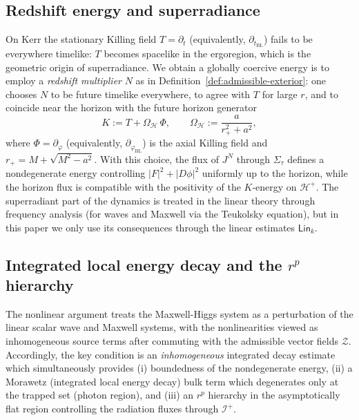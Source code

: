 \documentclass[11pt]{article}
\numberwithin{equation}{section}
\theoremstyle{plain}
\theoremstyle{definition}
\theoremstyle{remark}
\newcommand{\Lin}{\mathsf{Lin}}
\begin{document}
\subsection{Redshift energy and superradiance}\label{subsec:kerr-redshift}

On Kerr the stationary Killing field $T=\partial_{t}$ (equivalently, $\partial_{t_{\mathrm{BL}}}$) fails to be everywhere timelike: $T$ becomes spacelike in the ergoregion, which is the geometric origin of superradiance.
We obtain a globally coercive energy is to employ a \emph{redshift multiplier} $N$ as in Definition~\ref{def:admissible-exterior}: one chooses $N$ to be future timelike everywhere, to agree with $T$ for large $r$, and to coincide near the horizon with the future horizon generator
\begin{equation}\label{eq:kerr-horizon-generator}
K:=T+\Omega_{\mathcal H}\,\Phi,
\qquad
\Omega_{\mathcal H}:=\frac{a}{r_{+}^{2}+a^{2}},
\end{equation}
where $\Phi=\partial_{\varphi}$ (equivalently, $\partial_{\varphi_{\mathrm{BL}}}$) is the axial Killing field and $r_{+}=M+\sqrt{M^{2}-a^{2}}$.
With this choice, the flux of $J^{N}$ through $\Sigma_{\tau}$ defines a nondegenerate energy controlling $|F|^{2}+|D\phi|^{2}$ uniformly up to the horizon, while the horizon flux is compatible with the positivity of the $K$-energy on $\mathcal H^{+}$.
The superradiant part of the dynamics is treated in the linear theory through frequency analysis (for waves and Maxwell via the Teukolsky equation), but in this paper we only use its consequences through the linear estimates $\Lin_{k}$.

\subsection{Integrated local energy decay and the \texorpdfstring{$r^{p}$}{rp} hierarchy}\label{subsec:kerr-iledecay}

The nonlinear argument treats the Maxwell-Higgs system as a perturbation of the linear scalar wave and Maxwell systems, with the nonlinearities viewed as inhomogeneous source terms after commuting with the admissible vector fields $\mathcal Z$.
Accordingly, the key condition is an \emph{inhomogeneous} integrated decay estimate which simultaneously provides
(i) boundedness of the nondegenerate energy, (ii) a Morawetz (integrated local energy decay) bulk term which degenerates only at the trapped set (photon region), and (iii) an $r^{p}$ hierarchy in the asymptotically flat region controlling the radiation fluxes through $\mathcal I^{+}$.
\end{document}
